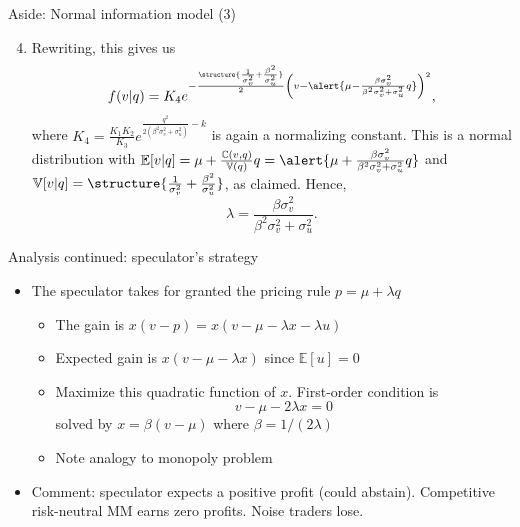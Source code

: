 \documentclass[english,10pt]{beamer}
\begin{document}
\begin{frame}{Aside: Normal information model (3)}
	\begin{enumerate}
		\setcounter{enumi}{3}
		\item Rewriting, this gives us
		\[
		f(v|q) = K_4 e^{-\frac{\structure{\frac{1}{\sigma^2_v}+\frac{\beta^2}{\sigma^2_u}}}{2} \left(v-\alert{\mu-\frac{\beta \sigma^2_v}{\beta^2 \sigma^2_v + \sigma^2_u}q }\right)^2},
		\]
		where $K_4=\frac{K_1 K_2}{K_3}e^{ \frac{q^2}{2(\beta^2 \sigma^2_v + \sigma^2_u)}-k}$ is again a normalizing constant.
		This is  a normal distribution with $\mathbb{E}[v|q] = \mu + \frac{\mathbb{C}(v,q)}{\mathbb{V}(q)} q=\alert{\mu+\frac{\beta \sigma^2_v}{\beta^2 \sigma^2_v + \sigma^2_u}q}$ and $\mathbb{V}[v|q]=\structure{\frac{1}{\sigma^2_v}+\frac{\beta^2}{\sigma^2_u}}$, as claimed. Hence,
		\[
		\lambda = \frac{\beta \sigma^2_v}{\beta^2 \sigma^2_v + \sigma^2_u}.
		\]
	\end{enumerate}
\end{frame}


\begin{frame}{Analysis continued: speculator's strategy}
	\begin{itemize}
		\item The speculator takes for granted the pricing rule $p=\mu+\lambda q$
		\begin{itemize}
			\item The gain is $x(v-p) = x(v-\mu-\lambda x - \lambda u)$
			\item Expected gain is $x(v-\mu-\lambda x)$ since $\mathbb{E}[u]=0$
			\item Maximize this quadratic function of $x$. First-order condition is
			\[
			v-\mu -2\lambda x=0
			\]
			solved by $x=\beta(v-\mu)$ where $\beta=1/(2\lambda)$
			\item Note analogy to monopoly problem
		\end{itemize}
		\item Comment: speculator expects a positive profit (could abstain). Competitive risk-neutral MM earns zero profits. Noise traders lose.
	\end{itemize}
\end{frame}
\end{document}
